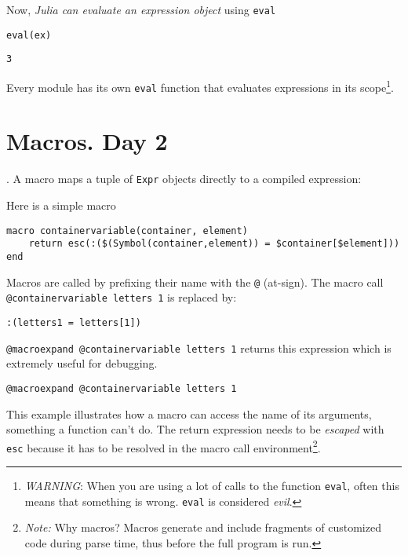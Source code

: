 \documentclass[letterpaper]{tufte-handout}
\begin{document}
Now, \emph{Julia can evaluate an expression object} using \texttt{eval}

\begin{verbatim}
eval(ex)
\end{verbatim}

\begin{verbatim}
3
\end{verbatim}


Every module has its own \texttt{eval} function that evaluates expressions in
its scope\footnote{\emph{WARNING}: When you are using a lot of calls to the
function \texttt{eval}, often this means that something is wrong. \texttt{eval} is
considered \emph{evil}.}.

\section{Macros. Day 2}
\label{sec:org67109ea}

. A macro
maps a tuple of \texttt{Expr} objects directly to a compiled expression:

Here is a simple macro

\begin{verbatim}
macro containervariable(container, element)
    return esc(:($(Symbol(container,element)) = $container[$element]))
end
\end{verbatim}

Macros are called by prefixing their name with the \texttt{@} (at-sign). The
macro call \texttt{@containervariable letters 1} is replaced by:

\begin{verbatim}
:(letters1 = letters[1])
\end{verbatim}

\texttt{@macroexpand @containervariable letters 1} returns this expression
which is extremely useful for debugging.

\begin{verbatim}
@macroexpand @containervariable letters 1
\end{verbatim}

This example illustrates how a macro can access the name of its
arguments, something a function can’t do. The return expression needs
to be \emph{escaped} with \texttt{esc} because it has to be resolved in the macro
call environment\footnote{\emph{Note:} Why macros? Macros generate and include
fragments of customized code during parse time, thus before the full
program is run.}.
\end{document}
